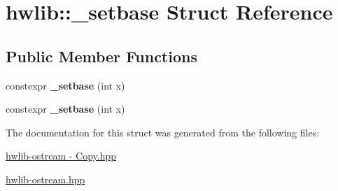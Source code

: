 \hypertarget{structhwlib_1_1__setbase}{}\section{hwlib\+:\+:\+\_\+setbase Struct Reference}
\label{structhwlib_1_1__setbase}
\subsection*{Public Member Functions}
\begin{DoxyCompactItemize}
\item 
constexpr {\bfseries \+\_\+setbase} (int x)\hypertarget{structhwlib_1_1__setbase_aacb4b037a7f55889db8afba3c31128a1}{}\label{structhwlib_1_1__setbase_aacb4b037a7f55889db8afba3c31128a1}

\item 
constexpr {\bfseries \+\_\+setbase} (int x)\hypertarget{structhwlib_1_1__setbase_aacb4b037a7f55889db8afba3c31128a1}{}\label{structhwlib_1_1__setbase_aacb4b037a7f55889db8afba3c31128a1}

\end{DoxyCompactItemize}


The documentation for this struct was generated from the following files\+:\begin{DoxyCompactItemize}
\item 
\hyperlink{hwlib-ostream_01-_01_copy_8hpp}{hwlib-\/ostream -\/ Copy.\+hpp}\item 
\hyperlink{hwlib-ostream_8hpp}{hwlib-\/ostream.\+hpp}\end{DoxyCompactItemize}
